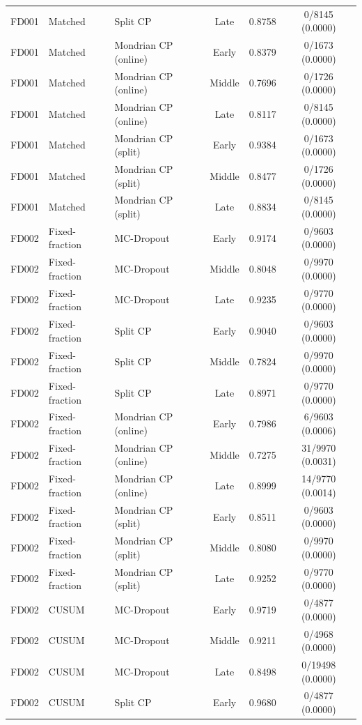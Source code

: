 \begin{table}[t]
\begin{tabular}{lllccc}
FD001 & Matched & Split CP & Late & 0.8758 & 0/8145 (0.0000) \\
FD001 & Matched & Mondrian CP (online) & Early & 0.8379 & 0/1673 (0.0000) \\
FD001 & Matched & Mondrian CP (online) & Middle & 0.7696 & 0/1726 (0.0000) \\
FD001 & Matched & Mondrian CP (online) & Late & 0.8117 & 0/8145 (0.0000) \\
FD001 & Matched & Mondrian CP (split) & Early & 0.9384 & 0/1673 (0.0000) \\
FD001 & Matched & Mondrian CP (split) & Middle & 0.8477 & 0/1726 (0.0000) \\
FD001 & Matched & Mondrian CP (split) & Late & 0.8834 & 0/8145 (0.0000) \\
FD002 & Fixed-fraction & MC-Dropout & Early & 0.9174 & 0/9603 (0.0000) \\
FD002 & Fixed-fraction & MC-Dropout & Middle & 0.8048 & 0/9970 (0.0000) \\
FD002 & Fixed-fraction & MC-Dropout & Late & 0.9235 & 0/9770 (0.0000) \\
FD002 & Fixed-fraction & Split CP & Early & 0.9040 & 0/9603 (0.0000) \\
FD002 & Fixed-fraction & Split CP & Middle & 0.7824 & 0/9970 (0.0000) \\
FD002 & Fixed-fraction & Split CP & Late & 0.8971 & 0/9770 (0.0000) \\
FD002 & Fixed-fraction & Mondrian CP (online) & Early & 0.7986 & 6/9603 (0.0006) \\
FD002 & Fixed-fraction & Mondrian CP (online) & Middle & 0.7275 & 31/9970 (0.0031) \\
FD002 & Fixed-fraction & Mondrian CP (online) & Late & 0.8999 & 14/9770 (0.0014) \\
FD002 & Fixed-fraction & Mondrian CP (split) & Early & 0.8511 & 0/9603 (0.0000) \\
FD002 & Fixed-fraction & Mondrian CP (split) & Middle & 0.8080 & 0/9970 (0.0000) \\
FD002 & Fixed-fraction & Mondrian CP (split) & Late & 0.9252 & 0/9770 (0.0000) \\
FD002 & CUSUM & MC-Dropout & Early & 0.9719 & 0/4877 (0.0000) \\
FD002 & CUSUM & MC-Dropout & Middle & 0.9211 & 0/4968 (0.0000) \\
FD002 & CUSUM & MC-Dropout & Late & 0.8498 & 0/19498 (0.0000) \\
FD002 & CUSUM & Split CP & Early & 0.9680 & 0/4877 (0.0000) \\

\end{tabular}
\end{table}
